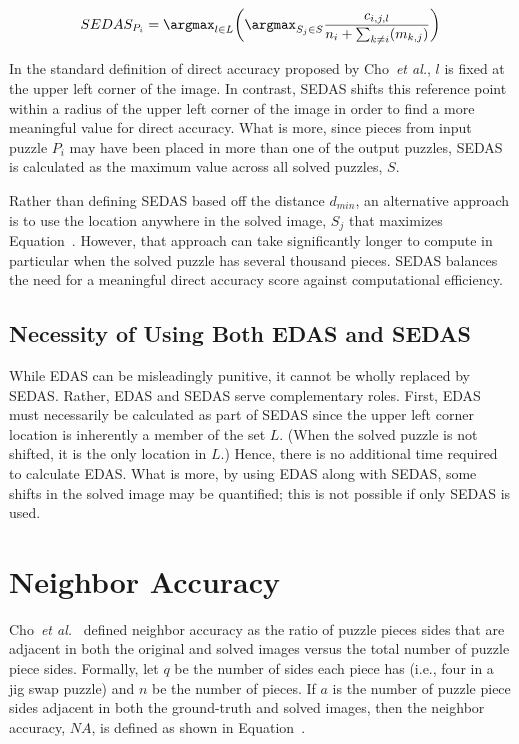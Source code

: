 \begin{equation} \label{eq:shiftableEnhancedDirectAccuracyScore}
SEDAS_{P_i} = \argmax_{l \in L} \bigg( \argmax_{S_j \in S}\frac{c_{i,j,l}}{n_i + \sum_{k \ne i}(m_{k,j})} \bigg)
\end{equation}

In the standard definition of direct accuracy proposed by Cho~\textit{et al.}, $l$ is fixed at the upper left corner of the image.  In contrast, SEDAS shifts this reference point within a radius of the upper left corner of the image in order to find a more meaningful value for direct accuracy. What is more, since pieces from input puzzle $P_i$ may have been placed in more than one of the output puzzles, SEDAS is calculated as the maximum value across all solved puzzles, $S$.

Rather than defining SEDAS based off the distance $d_{min}$, an alternative approach is to use the location anywhere in the solved image, $S_j$ that maximizes Equation~.  However, that approach can take significantly longer to compute in particular when the solved puzzle has several thousand pieces.  SEDAS balances the need for a meaningful direct accuracy score against computational efficiency.

\subsection{Necessity of Using Both EDAS and SEDAS}\label{sec:importanceEdasSedas}

While EDAS can be misleadingly punitive, it cannot be wholly replaced by SEDAS.  Rather, EDAS and SEDAS serve complementary roles.  First, EDAS must necessarily be calculated as part of SEDAS since the upper left corner location is inherently a member of the set $L$. (When the solved puzzle is not shifted, it is the only location in $L$.)  Hence, there is no additional time required to calculate EDAS.  What is more, by using EDAS along with SEDAS, some shifts in the solved image may be quantified; this is not possible if only SEDAS is used.

\section{Neighbor Accuracy}\label{sec:neighborAccuracy}

Cho~\textit{et al.}~\cite{cho2010} defined neighbor accuracy as the ratio of puzzle pieces sides that are adjacent in both the original and solved images versus the total number of puzzle piece sides.  Formally, let $q$ be the number of sides each piece has (i.e., four in a jig swap puzzle) and $n$ be the number of pieces.  If $a$ is the number of puzzle piece sides adjacent in both the ground-truth and solved images, then the neighbor accuracy, $NA$, is defined as shown in Equation~.

